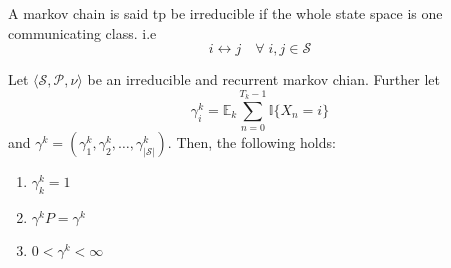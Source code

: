 \begin{definition}
    A markov chain is said tp be irreducible if the whole state space is one communicating class. i.e
    \[
        i \leftrightarrow j \quad \forall\; i,j \in \mathcal{S}
    \]
\end{definition}
\begin{theorem}\label{thm:gamma}
    Let \(\langle \mathcal{S} , \mathcal{P} , \nu \rangle\) be an irreducible
    and recurrent markov chian. Further let 
    \[
        \gamma _i^k = \mathbb{E}_k  \sum_{n=0}^{T_k - 1} \mathbb{I} \{X_n = i\} 
    \]
    and \(\gamma ^k = (\gamma _1^k , \gamma _2^k, \dots , \gamma _{|\mathcal{S}|}^k)\).
    Then, the following holds:
    \begin{enumerate}
        \item \(\gamma ^k_k = 1\)
        \item \(\gamma ^k P = \gamma ^k\)
        \item \(0 < \gamma ^k < \infty\)  
    \end{enumerate}
\end{theorem}
